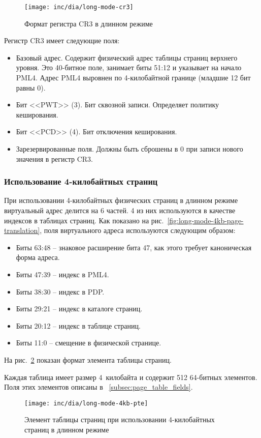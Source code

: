 \begin{figure}[ht!]
  \centering
  \texttt{[image: inc/dia/long-mode-cr3]}
  \caption{Формат регистра CR3 в длинном режиме}
  \label{fig:long-mode-cr3}
\end{figure}

Регистр CR3 имеет следующие поля:
\begin{itemize}
\item Базовый адрес. Содержит физический адрес таблицы страниц верхнего уровня. Это 40-битное поле, занимает биты
	51:12 и указывает на начало PML4. Адрес PML4 выровнен по 4-килобайтной границе (младшие 12 бит равны 0).
\item Бит <<PWT>> (3). Бит сквозной записи. Определяет политику кеширования.
\item Бит <<PCD>> (4). Бит отключения кеширования.
\item Зарезервированные поля. Должны быть сброшены в 0 при записи нового значения в регистр CR3.
\end{itemize}

\subsubsection*{Использование 4-килобайтных страниц}
При использовании 4-килобайтных физических страниц в длинном режиме виртуальный адрес делится на 6 частей.
4 из них используются в качестве индексов в таблицах страниц. Как показано на рис.~\ref{fig:long-mode-4kb-page-translation},
поля виртуального адреса используются следующим образом:
\begin{itemize}
\item Биты 63:48 -- знаковое расширение бита 47, как этого требует каноническая форма адреса.
\item Биты 47:39 -- индекс в PML4.
\item Биты 38:30 -- индекс в PDP.
\item Биты 29:21 -- индекс в каталоге страниц.
\item Биты 20:12 -- индекс в таблице страниц.
\item Биты 11:0 -- смещение в физической странице.
\end{itemize}

На рис.~\ref{fig:long-mode-4kb-pte} показан формат элемента таблицы страниц.

Каждая таблица имеет размер 4~килобайта и содержит 512 64-битных элементов. Поля этих элементов
описаны в ~\ref{subsec:page_table_fields}.

\begin{figure}[ht!]
  \centering
  \texttt{[image: inc/dia/long-mode-4kb-pte]}
  \caption{Элемент таблицы страниц при использовании 4-килобайтных страниц в длинном режиме}
  \label{fig:long-mode-4kb-pte}
\end{figure}

